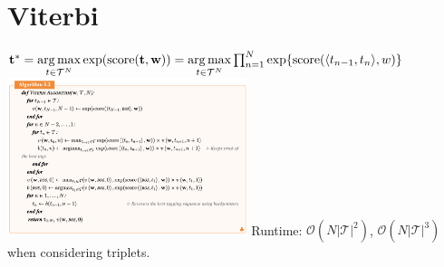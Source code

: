 \section{Viterbi}
$\mathbf{t}^* = \underset{t \in \mathcal{T}^N}{\operatorname*{arg\,max}} \exp(\text{score}(\mathbf{t}, \mathbf{w})) = \underset{t \in \mathcal{T}^N}{\operatorname*{arg\,max}} \prod_{n=1}^{N}\exp \{\text{score}(\langle t_{n-1}, t_n \rangle, w)\}$\\
\includegraphics[width=7cm]{viterbi_algo.png}
Runtime: $\mathcal{O}(N|\mathcal{T}|^2)$, $\mathcal{O}(N |\mathcal{T}|^3)$ when considering triplets.